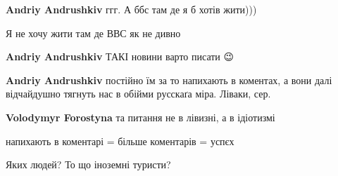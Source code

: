 \begin{itemize}
\textbf{Andriy Andrushkiv} ггг. А ббс там де я б хотів жити)))

 
Я не хочу жити там де ВВС як не дивно

 
\textbf{Andriy Andrushkiv} ТАКІ новини варто писати 😉

 
\textbf{Andriy Andrushkiv} постійно їм за то напихають в коментах, а вони далі відчайдушно тягнуть нас в обійми русскаґа міра. Ліваки, сер.

 
\textbf{Volodymyr Forostyna} та питання не в лівизні, а в ідіотизмі

 
напихають в коментарі = більше коментарів = успєх

 
Яких людей? То що іноземні туристи?

 


\end{itemize}

